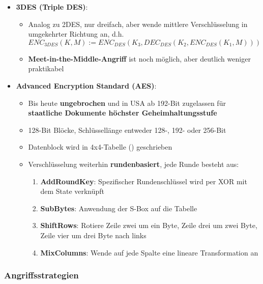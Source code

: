 \begin{itemize}
\begin{itemize}
	\end{itemize}
	\item \textbf{3DES (Triple DES)}:
	\begin{itemize}
		\item Analog zu 2DES, nur dreifach, aber wende mittlere Verschlüsselung in umgekehrter Richtung an, d.h.
		$$
			ENC_{3DES}(K, M) := ENC_{DES}(K_3, DEC_{DES}(K_2, ENC_{DES}(K_1, M)))
		$$
		\item \textbf{Meet-in-the-Middle-Angriff} ist noch möglich, aber deutlich weniger praktikabel
	\end{itemize}
	\item \textbf{Advanced Encryption Standard (AES)}:
	\begin{itemize}
		\item Bis heute \textbf{ungebrochen} und in USA ab 192-Bit zugelassen für \textbf{staatliche Dokumente höchster Geheimhaltungsstufe}
		\item 128-Bit Blöcke, Schlüssellänge entweder 128-, 192- oder 256-Bit
		\item Datenblock wird in 4x4-Tabelle () geschrieben
		\item Verschlüsselung weiterhin \textbf{rundenbasiert}, jede Runde besteht aus:
		\begin{enumerate}
			\item \textbf{AddRoundKey}: Spezifischer Rundenschlüssel wird per XOR mit dem State verknüpft
			\item \textbf{SubBytes}: Anwendung der S-Box auf die Tabelle
			\item \textbf{ShiftRows}: Rotiere Zeile zwei um ein Byte, Zeile drei um zwei Byte, Zeile vier um drei Byte nach links
			\item \textbf{MixColumns}: Wende auf jede Spalte eine lineare Transformation an
		\end{enumerate}
	\end{itemize}
\end{itemize}

\subsubsection{Angriffsstrategien}%
\label{symver:ssub:angriffsstrategien}

